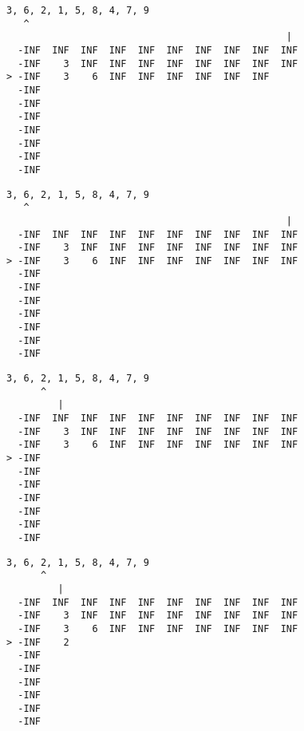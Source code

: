 { \begin{verbatim}
3, 6, 2, 1, 5, 8, 4, 7, 9
   ^
                                                 |
  -INF  INF  INF  INF  INF  INF  INF  INF  INF  INF
  -INF    3  INF  INF  INF  INF  INF  INF  INF  INF
> -INF    3    6  INF  INF  INF  INF  INF  INF     
  -INF                                             
  -INF                                             
  -INF                                             
  -INF                                             
  -INF                                             
  -INF                                             
  -INF                                             
\end{verbatim} }

{ \begin{verbatim}
3, 6, 2, 1, 5, 8, 4, 7, 9
   ^
                                                 |
  -INF  INF  INF  INF  INF  INF  INF  INF  INF  INF
  -INF    3  INF  INF  INF  INF  INF  INF  INF  INF
> -INF    3    6  INF  INF  INF  INF  INF  INF  INF
  -INF                                             
  -INF                                             
  -INF                                             
  -INF                                             
  -INF                                             
  -INF                                             
  -INF                                             
\end{verbatim} }

{ \begin{verbatim}
3, 6, 2, 1, 5, 8, 4, 7, 9
      ^
         |
  -INF  INF  INF  INF  INF  INF  INF  INF  INF  INF
  -INF    3  INF  INF  INF  INF  INF  INF  INF  INF
  -INF    3    6  INF  INF  INF  INF  INF  INF  INF
> -INF                                             
  -INF                                             
  -INF                                             
  -INF                                             
  -INF                                             
  -INF                                             
  -INF                                             
\end{verbatim} }

{ \begin{verbatim}
3, 6, 2, 1, 5, 8, 4, 7, 9
      ^
         |
  -INF  INF  INF  INF  INF  INF  INF  INF  INF  INF
  -INF    3  INF  INF  INF  INF  INF  INF  INF  INF
  -INF    3    6  INF  INF  INF  INF  INF  INF  INF
> -INF    2                                        
  -INF                                             
  -INF                                             
  -INF                                             
  -INF                                             
  -INF                                             
  -INF                                             
\end{verbatim} }

